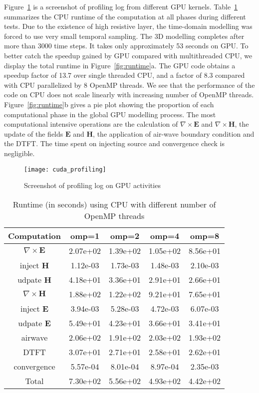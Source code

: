 \documentclass[a4paper,10pt]{article}
\begin{document}
Figure~\ref{fig:screenshot} is a screenshot of profiling log from different GPU kernels.   Table~\ref{table:cputime} summarizes the CPU runtime of the computation at all phases during different tests. Due to the existence of high resistive layer, the time-domain modelling was forced to use very small temporal sampling. The 3D modelling completes after more than 3000 time steps. It takes only approximately 53 seconds on GPU. To better catch the speedup gained by GPU compared with multithreaded CPU, we display the total runtime in Figure~\ref{fig:runtime}a.  The GPU code obtains a speedup factor of 13.7 over single threaded CPU, and a factor of 8.3 compared with CPU parallelized by 8 OpenMP threads.  We see that the performance of the code on CPU does not scale linearly with increasing number of OpenMP threads. Figure~\ref{fig:runtime}b gives a pie plot showing the proportion of each computational phase in the global GPU modelling process. The most computational intensive operations are the calculation of $\nabla\times \mathbf{E}$ and $\nabla\times\mathbf{H}$, the update of the fields $\mathbf{E}$ and $\mathbf{H}$, the application of air-wave boundary condition and the DTFT. The time spent on injecting source and convergence check is negligible.


\begin{figure}[!htb]
  \centering
  \texttt{[image: cuda\_profiling]}
  \caption{Screenshot of profiling log on GPU activities}\label{fig:screenshot}
\end{figure}

  
\begin{table} 
\centering
  \caption{Runtime (in seconds) using CPU with different number of OpenMP threads}\label{table:cputime} 
  \begin{tabular}{c|c|c|c|c}   
  \hline
  Computation    & omp=1 	& omp=2       & omp=4       & omp=8 \\
  \hline  
  $\nabla\times\mathbf{E}$   	 &2.07e+02  &1.39e+02 &1.05e+02 &8.56e+01\\
  inject $\mathbf{H}$ 	 &1.12e-03  &1.73e-03 &1.48e-03 &2.10e-03\\
  udpate $\mathbf{H}$ 	 &4.18e+01  &3.36e+01 &2.91e+01 &2.66e+01\\
  $\nabla\times\mathbf{H}$   	 &1.88e+02  &1.22e+02 &9.21e+01 &7.65e+01\\
  inject $\mathbf{E}$ 	 &3.94e-03  &5.28e-03 &4.72e-03 &6.07e-03\\
  udpate $\mathbf{E}$ 	 &5.49e+01  &4.23e+01 &3.66e+01 &3.41e+01\\
  airwave 	 &2.06e+02  &1.91e+02 &2.03e+02 &1.93e+02\\
  DTFT    	 &3.07e+01  &2.71e+01 &2.58e+01 &2.62e+01\\
  convergence  	 &5.57e-04  &8.01e-04 &8.97e-04 &2.35e-03\\
  Total   	 &7.30e+02  &5.56e+02 &4.93e+02 &4.42e+02\\
  \hline
  \end{tabular}
\end{table}
\end{document}
